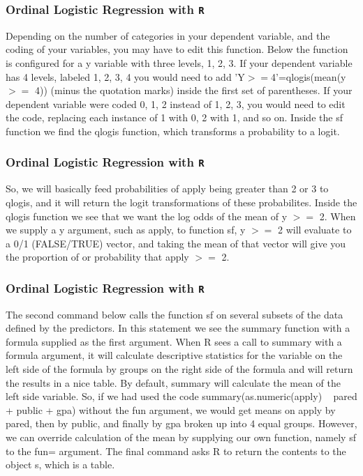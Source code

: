 \documentclass[00-GLMregslides.tex]{subfiles}
\begin{document}
\begin{frame}[fragile]

\frametitle{Ordinal Logistic Regression with \texttt{R}}
\Large

Depending on the number of categories in your dependent variable, and the coding of your variables, you may have to edit this function. Below the function is configured for a y variable with three levels, 1, 2, 3. If your dependent variable has 4 levels, labeled 1, 2, 3, 4 you would need to add 'Y$>=$4'=qlogis(mean(y $>=$ 4)) (minus the quotation marks) inside the first set of parentheses. If your dependent variable were coded 0, 1, 2 instead of 1, 2, 3, you would need to edit the code, replacing each instance of 1 with 0, 2 with 1, and so on. Inside the sf function we find the qlogis function, which transforms a probability to a logit. 

\end{frame}
\begin{frame}[fragile]

\frametitle{Ordinal Logistic Regression with \texttt{R}}
\Large
So, we will basically feed probabilities of apply being greater than 2 or 3 to qlogis, and it will return the logit transformations of these probabilites. Inside the qlogis function we see that we want the log odds of the mean of y $>=$ 2. When we supply a y argument, such as apply, to function sf, y $>=$ 2 will evaluate to a 0/1 (FALSE/TRUE) vector, and taking the mean of that vector will give you the proportion of or probability that apply $>=$ 2.
\end{frame}
\begin{frame}[fragile]

\frametitle{Ordinal Logistic Regression with \texttt{R}}
\Large
The second command below calls the function sf on several subsets of the data defined by the predictors. In this statement we see the summary function with a formula supplied as the first argument. When R sees a call to summary with a formula argument, it will calculate descriptive statistics for the variable on the left side of the formula by groups on the right side of the formula and will return the results in a nice table. By default, summary will calculate the mean of the left side variable. So, if we had used the code summary(as.numeric(apply) ~ pared + public + gpa) without the fun argument, we would get means on apply by pared, then by public, and finally by gpa broken up into 4 equal groups. However, we can override calculation of the mean by supplying our own function, namely sf to the fun= argument. The final command asks R to return the contents to the object s, which is a table.
\end{frame}
\end{document}
